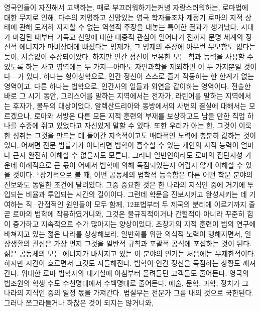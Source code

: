 영국인들이 자진해서 고백하는,
때로 부끄러워하기는커녕 자랑스러워하는,
로마법에 대한 무지로 인해,
다수의 저명하고 신망있는 영국 학자들조차
제정기 로마의 지적 상태에 관해 도저히 지지할 수 없는
역설적 주장을 내놓는 특이한 결과가 생겨났다.
 시대가 마감된 때부터
기독교 신앙에 대한 대중적 관심이 일어나기 전까지
문명 세계의 정신적 에너지가 마비상태에 빠졌다는 명제가,
그 명제의 주장에 아무런 무모함도 없다는 듯이,
서슴없이
주장되어왔다.
하지만
인간 정신이 보유한 모든 힘과 능력을 사용할 수 있도록 하는
사고 영역에는 두 가지---아마도 자연과학을 제외하면
이 두 가지뿐일 것이다---가 있다.
하나는 형이상학으로,
인간 정신이 스스로 즐겨 작동하는 한 한계가 없는 영역이고,
다른 하나는 법학으로,
인간사의 일들과 외연을 같이하는 영역이다.
전술한 바로 그 시기 동안,
그리스어를 말하는 지역에서는 전자가,
라틴어를 말하는 지역에서는 후자가,
몰두의 대상이었다.
알렉산드리아와 동방에서의 사변의 결실에 대해서는 모르겠으나,
로마와 서방은
다른 모든 지적 훈련의 부재를 보상하고도 남을 만한
직업 하나를 수중에 쥐고 있었다고
자신있게 말할 수 있다.
또한 우리가 아는 한,
그것이 이룩한 성취는
그것을 만드는 데 들어간 지속적이고도 배타적인 노력에
충분히
값하는 것이었다.
어쩌면
전문 법률가가 아니라면
법학이 흡수할 수 있는 개인의 지적 능력이 얼마나 큰지
완전히 이해할 수 없을지도 모른다.
그러나 일반인이라도
로마의 집단지성 가운데 이례적으로 큰 몫이
어째서 법학에 의해
독점되었는지
어렵지 않게 이해할 수 있을 것이다.
``장기적으로 볼 때,
어떤 공동체의
법학적 능숙함은
다른 어떤 학문 분야의 진보와도 동일한 조건에 달려있다.
그중 중요한 것은 한 나라의 지식인 중에 거기에 투입되는 비율과
투입되는 시간의 길이이다.
그런데
학문을 진보시키고 완성시키는 데 기여하는
직^^b7간접적인 원인들이 모두 함께,
12표법부터 두 제국의 분리에 이르기까지 줄곧
로마의 법학에 작용하였거니와,
그것은 불규칙적이거나 간헐적이 아니라
꾸준히 힘이 증가하고 지속적으로 수가 많아지는 양상이었다.
초창기의 지적 훈련이 법의 연구에 바쳐지고 있는 젊은 나라를 상상해보라.
일반화를 위한 의식적 노력이 행해지면서,
일상생활의 관심은 가장 먼저
그것을 일반적 규칙과 포괄적 공식에 포섭하는 것이 된다.
젊은 공동체의 모든 에너지가 바쳐지고 있는 이 분야의 인기는
처음에는 무제한적이다.
하지만 시간이 흐르면서 그것도 시들해진다.
법학이 인간 정신을 독점하는 상황도 깨져간다.
위대한 로마 법학자의 대기실에 아침부터 몰려들던 고객들도 줄어든다.
영국의 법조원의 학생 수도
수천명대에서 수백명대로 줄어든다.
예술, 문학, 과학, 정치가 그 나라의 지식인 중의 일정 몫을 가져간다.
법실무는 전문가 그룹 내의 것으로 국한된다.
그러나 쪼그라들거나 하찮은 것이 되지는 않거니와,
